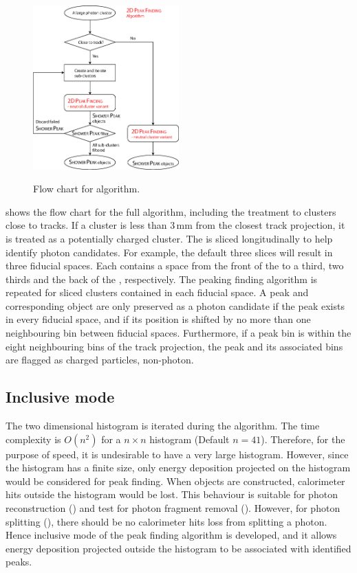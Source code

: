 \begin{figure}[tbph]
\centering
{\includegraphics[width=0.5\textwidth]{photon/2DpeakFindingTrack}}
\caption[Flow chart for \peakFinding algorithm.]
{Flow chart for \peakFinding algorithm.}
\label{fig:photonPeakFindingFlow}
\end{figure}

 shows the flow chart for the full \peakFinding algorithm, including the treatment to clusters close to tracks. If a cluster is less than 3\,mm from the closest track projection, it is treated as a potentially charged cluster. The \ECAL is sliced longitudinally to help identify photon candidates. For example, the default three slices will result in three \ECAL fiducial spaces. Each contains a space from the front of the \ECAL to a third, two thirds and the back of the \ECAL, respectively. The peaking finding algorithm is repeated for sliced clusters contained in each fiducial space. A peak and corresponding \ShowerPeak object  are only preserved as a photon candidate if the peak exists in every fiducial space, and if its position is shifted by no more than one neighbouring bin between fiducial spaces. Furthermore, if a peak bin is within the eight neighbouring bins of the track projection, the peak and its associated bins are flagged as charged particles, non-photon.

\subsection{Inclusive mode}
\label{sec:photonPeakFindingInclusive}

The two dimensional histogram is iterated during the algorithm. The time complexity is $O(n^2)$ for a $n \times n$ histogram (Default $n = 41$). Therefore, for the purpose of speed, it is undesirable to have a very large histogram. However, since the histogram has a finite size, only energy deposition projected on the histogram would be considered for peak finding. When \ShowerPeak objects are constructed, calorimeter hits outside the histogram would be lost. This behaviour is suitable for photon reconstruction () and test for photon fragment removal (). However, for photon splitting (), there should be no calorimeter hits loss from splitting a photon. Hence inclusive mode of the peak finding algorithm is developed, and it allows energy deposition projected outside the histogram to be associated with identified peaks.


